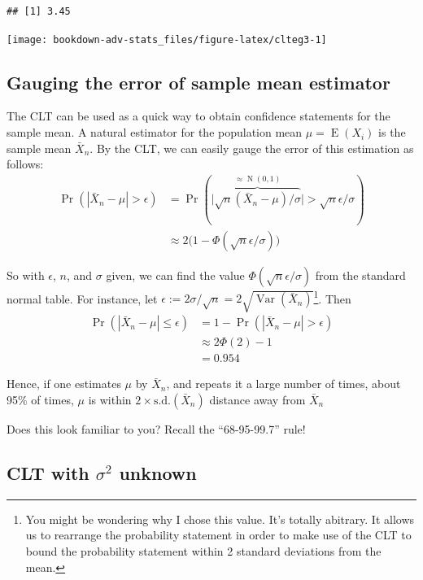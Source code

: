 \documentclass[
]{book}
\DeclareMathOperator{\E}{E}
\DeclareMathOperator{\Var}{Var}
\DeclareMathOperator{\N}{N}
\theoremstyle{definition}
\theoremstyle{definition}
\theoremstyle{definition}
\theoremstyle{definition}
\theoremstyle{remark}
\begin{document}
\begin{verbatim}
## [1] 3.45
\end{verbatim}

\begin{center}\texttt{[image: bookdown-adv-stats\_files/figure-latex/clteg3-1]} \end{center}

\hypertarget{gauging-the-error-of-sample-mean-estimator}{%
\subsection{Gauging the error of sample mean estimator}\label{gauging-the-error-of-sample-mean-estimator}}

The CLT can be used as a quick way to obtain confidence statements for the sample mean.
A natural estimator for the population mean \(\mu=\E(X_i)\) is the sample mean \(\bar X_n\).
By the CLT, we can easily gauge the error of this estimation as follows:
\[\begin{aligned}
    \Pr(|\bar X_n-\mu| > \epsilon)
    &= \Pr(\big|\overbrace{\sqrt{n}(\bar X_n - \mu)/\sigma}^{\approx\N(0,1)} \big| > \sqrt{n}\epsilon/\sigma) \\
    &\approx 2\big(1-\Phi(\sqrt{n}\epsilon/\sigma)\big)
  \end{aligned}\]

So with \(\epsilon\), \(n\), and \(\sigma\) given, we can find the value \(\Phi(\sqrt{n}\epsilon/\sigma)\) from the standard normal table.
For instance, let \(\epsilon := 2\sigma/\sqrt{n} = 2 \sqrt{\Var(\bar X_n)}\)\footnote{You might be wondering why I chose this value. It's totally abitrary. It allows us to rearrange the probability statement in order to make use of the CLT to bound the probability statement within 2 standard deviations from the mean.}.
Then
\[
\begin{aligned}
\Pr(|\bar X_n-\mu| \leq \epsilon) 
&= 1 - \Pr(|\bar X_n-\mu| > \epsilon) \\
&\approx 2\Phi(2) - 1\\
&=0.954
\end{aligned}
\]

Hence, if one estimates \(\mu\) by \(\bar X_n\), and repeats it a large number of times, about 95\% of times, \(\mu\) is within \(2 \times \text{s.d.}(\bar X_n)\) distance away from \(\bar X_n\)

Does this look familiar to you? Recall the ``68-95-99.7'' rule!

\hypertarget{clt-with-sigma2-unknown}{%
\subsection{\texorpdfstring{CLT with \(\sigma^2\) unknown}{CLT with \textbackslash sigma\^{}2 unknown}}\label{clt-with-sigma2-unknown}}
\end{document}
